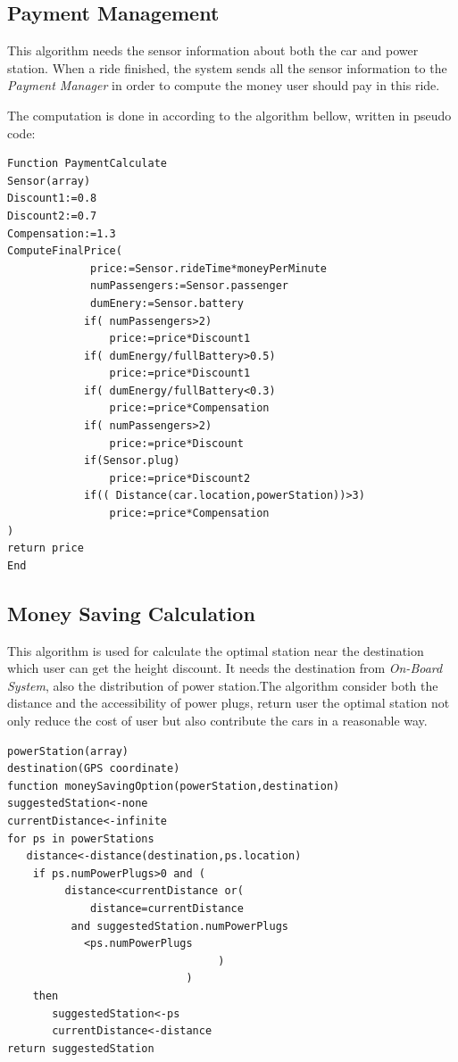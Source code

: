 \documentclass[a4paper,11pt]{article}
\begin{document}
	\subsection{Payment Management}
	This algorithm needs the sensor information about both the car and power station. When a ride finished, the system sends all the sensor information to the \textsl{Payment Manager} in order to compute the money user should pay in this ride.

The computation is done in according to the algorithm bellow, written in pseudo code:
\begin{lstlisting}[language={[ANSI]C}, frame=shadowbox]
Function PaymentCalculate 
Sensor(array)
Discount1:=0.8
Discount2:=0.7
Compensation:=1.3
ComputeFinalPrice(
             price:=Sensor.rideTime*moneyPerMinute
             numPassengers:=Sensor.passenger
             dumEnery:=Sensor.battery
            if( numPassengers>2)
                price:=price*Discount1
            if( dumEnergy/fullBattery>0.5)
                price:=price*Discount1 
            if( dumEnergy/fullBattery<0.3)
                price:=price*Compensation
            if( numPassengers>2)
                price:=price*Discount
            if(Sensor.plug)
                price:=price*Discount2
            if(( Distance(car.location,powerStation))>3)
                price:=price*Compensation
)
return price 
End 
\end{lstlisting}
	\subsection{Money Saving Calculation}
	This algorithm is used for calculate the optimal station near the destination which user can get the height discount. It needs the destination from \textsl{On-Board System}, also the distribution of power station.The algorithm consider both the distance and the accessibility of power plugs, return user the optimal station not only reduce the cost of user but also contribute the cars in a reasonable way.
	
\begin{lstlisting}[language={[ANSI]C}, frame=shadowbox]
powerStation(array)
destination(GPS coordinate)
function moneySavingOption(powerStation,destination)
suggestedStation<-none
currentDistance<-infinite 
for ps in powerStations
   distance<-distance(destination,ps.location)
    if ps.numPowerPlugs>0 and (
         distance<currentDistance or(
             distance=currentDistance 
          and suggestedStation.numPowerPlugs
          	<ps.numPowerPlugs
                                 )
                            )
    then
       suggestedStation<-ps
       currentDistance<-distance
return suggestedStation
\end{lstlisting}
\newpage
\end{document}
